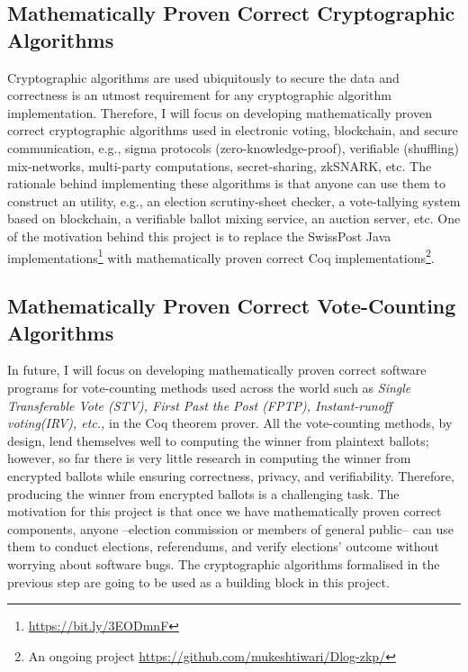 \documentclass[a4paper]{article}
\begin{document}
\subsection{Mathematically Proven Correct Cryptographic Algorithms}
	Cryptographic algorithms are used ubiquitously to secure 
	the data and correctness is an utmost requirement for 
	any cryptographic algorithm implementation. Therefore, 
	I will focus on developing mathematically proven correct cryptographic 
	algorithms used in electronic voting, blockchain, and secure communication, e.g., 
  	sigma protocols (zero-knowledge-proof), verifiable (shuffling) mix-networks, 
  	multi-party computations, secret-sharing, zkSNARK, etc.
	The rationale behind implementing these algorithms is that anyone can use them to construct 
	an utility, e.g., an election scrutiny-sheet checker, 
	a vote-tallying system based on blockchain,
	a verifiable ballot mixing service, an auction server, etc. One of the motivation
	behind this project is to replace the SwissPost Java implementations\footnote{\url{https://bit.ly/3EODmnF}} 
	with mathematically proven correct Coq 
	implementations\footnote{An ongoing project \url{https://github.com/mukeshtiwari/Dlog-zkp/}}.

	

	

\subsection{Mathematically Proven Correct Vote-Counting Algorithms}
In future, I will focus on developing mathematically proven correct
software programs for vote-counting methods used across the world
such as \textit{Single Transferable Vote (STV), 
First Past the Post (FPTP), Instant-runoff voting(IRV), etc.,} in the Coq theorem prover. 
All the vote-counting methods, by design, lend themselves well to computing the 
winner from plaintext ballots; however, so far there is very little research in computing 
the winner from encrypted ballots while ensuring correctness, privacy, and 
verifiability. Therefore, producing the winner from encrypted 
ballots is a challenging task.
The motivation for this project is that once we have  mathematically proven correct 
components, anyone --election commission or members of general public-- can use them 
to conduct elections, referendums, and verify elections' outcome 
without worrying about software bugs.  The cryptographic algorithms formalised in 
the previous step are going to be used as a building block in this project.
\end{document}
